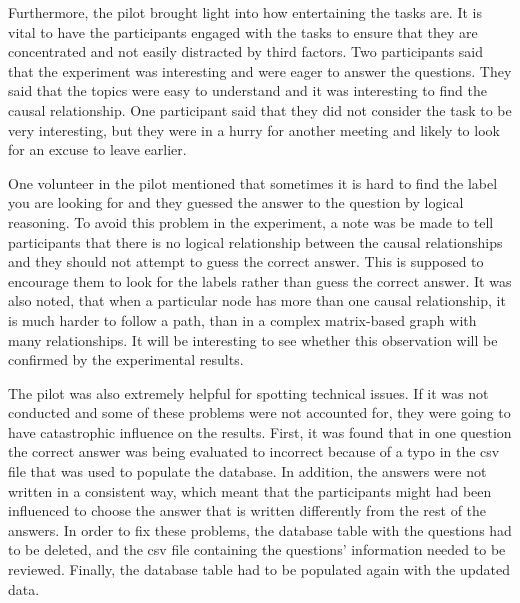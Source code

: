 \documentclass{l4proj}
\begin{document}
Furthermore, the pilot brought light into how entertaining the tasks are. It is vital to have the participants engaged with the tasks to ensure that they are concentrated and not easily distracted by third factors. Two participants said that the experiment was interesting and were eager to answer the questions. They said that the topics were easy to understand and it was interesting to find the causal relationship. One participant said that they did not consider the task to be very interesting, but they were in a hurry for another meeting and likely to look for an excuse to leave earlier.  

One volunteer in the pilot mentioned that sometimes it is hard to find the label you are looking for and they guessed the answer to the question by logical reasoning. To avoid this problem in the experiment, a note was be made to tell participants that there is no logical relationship between the causal relationships and they should not attempt to guess the correct answer. This is supposed to encourage them to look for the labels rather than guess the correct answer. It was also noted, that when a particular node has more than one causal relationship, it is much harder to follow a path, than in a complex matrix-based graph with many relationships. It will be interesting to see whether this observation will be confirmed by the experimental results.

The pilot was also extremely helpful for spotting technical issues. If it was not conducted and some of these problems were not accounted for, they were going to have catastrophic influence on the results. First, it was found that in one question the correct answer was being evaluated to incorrect because of a typo in the csv file that was used to populate the database. In addition, the answers were not written in a consistent way, which meant that the participants might had been influenced to choose the answer that is written differently from the rest of the answers. In order to fix these problems, the database table with the questions had to be deleted, and the csv file containing the questions' information needed to be reviewed. Finally, the database table had to be populated again with the updated data. 
\end{document}
